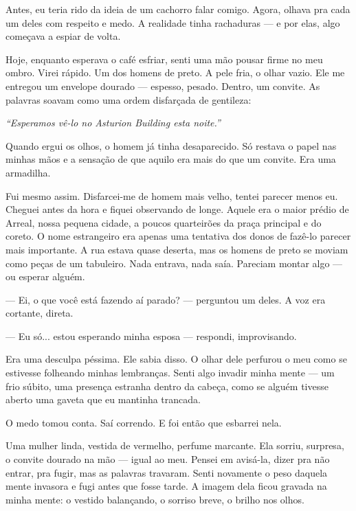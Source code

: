 Antes, eu teria rido da ideia de um cachorro falar comigo.  
Agora, olhava pra cada um deles com respeito e medo.  
A realidade tinha rachaduras — e por elas, algo começava a espiar de volta.

\medskip

Hoje, enquanto esperava o café esfriar, senti uma mão pousar firme no meu ombro.  
Virei rápido.  
Um dos homens de preto.  
A pele fria, o olhar vazio.  
Ele me entregou um envelope dourado — espesso, pesado.  
Dentro, um convite.  
As palavras soavam como uma ordem disfarçada de gentileza:

\emph{“Esperamos vê-lo no Asturion Building esta noite.”}

Quando ergui os olhos, o homem já tinha desaparecido.  
Só restava o papel nas minhas mãos e a sensação de que aquilo era mais do que um convite. Era uma armadilha.

\medskip

Fui mesmo assim.  
Disfarcei-me de homem mais velho, tentei parecer menos eu.  
Cheguei antes da hora e fiquei observando de longe.  
Aquele era o maior prédio de Arreal, nossa pequena cidade, a poucos quarteirões da praça principal e do coreto. O nome estrangeiro era apenas uma tentativa dos donos de fazê-lo parecer mais importante.
A rua estava quase deserta, mas os homens de preto se moviam como peças de um tabuleiro.  
Nada entrava, nada saía.  
Pareciam montar algo — ou esperar alguém.

— Ei, o que você está fazendo aí parado? — perguntou um deles.  
A voz era cortante, direta.

— Eu só... estou esperando minha esposa — respondi, improvisando.

Era uma desculpa péssima.  
Ele sabia disso.  
O olhar dele perfurou o meu como se estivesse folheando minhas lembranças.  
Senti algo invadir minha mente — um frio súbito, uma presença estranha dentro da cabeça, como se alguém tivesse aberto uma gaveta que eu mantinha trancada.

O medo tomou conta.  
Saí correndo.  
E foi então que esbarrei nela.

Uma mulher linda, vestida de vermelho, perfume marcante.  
Ela sorriu, surpresa, o convite dourado na mão — igual ao meu.  
Pensei em avisá-la, dizer pra não entrar, pra fugir, mas as palavras travaram.  
Senti novamente o peso daquela mente invasora e fugi antes que fosse tarde.  
A imagem dela ficou gravada na minha mente: o vestido balançando, o sorriso breve, o brilho nos olhos.

